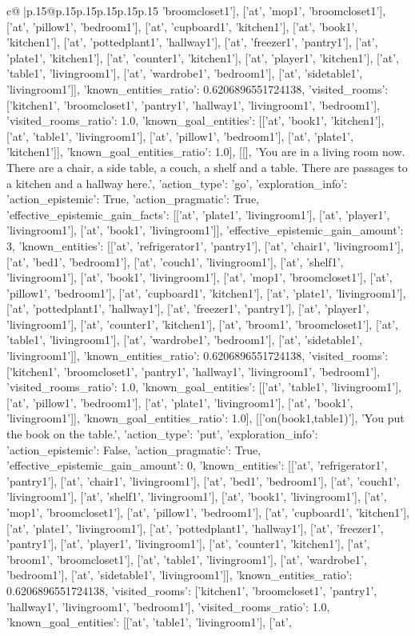 \documentclass{article}
\begin{document}
{\begin{supertabular}{c@{$\;$}|p{.15\linewidth}@{}p{.15\linewidth}p{.15\linewidth}p{.15\linewidth}p{.15\linewidth}p{.15\linewidth}}
{{{'broomcloset1'], ['at', 'mop1', 'broomcloset1'], ['at', 'pillow1', 'bedroom1'], ['at', 'cupboard1', 'kitchen1'], ['at', 'book1', 'kitchen1'], ['at', 'pottedplant1', 'hallway1'], ['at', 'freezer1', 'pantry1'], ['at', 'plate1', 'kitchen1'], ['at', 'counter1', 'kitchen1'], ['at', 'player1', 'kitchen1'], ['at', 'table1', 'livingroom1'], ['at', 'wardrobe1', 'bedroom1'], ['at', 'sidetable1', 'livingroom1']], 'known_entities_ratio': 0.6206896551724138, 'visited_rooms': ['kitchen1', 'broomcloset1', 'pantry1', 'hallway1', 'livingroom1', 'bedroom1'], 'visited_rooms_ratio': 1.0, 'known_goal_entities': [['at', 'book1', 'kitchen1'], ['at', 'table1', 'livingroom1'], ['at', 'pillow1', 'bedroom1'], ['at', 'plate1', 'kitchen1']], 'known_goal_entities_ratio': 1.0}}], [[], 'You are in a living room now. There are a chair, a side table, a couch, a shelf and a table. There are passages to a kitchen and a hallway here.', {'action_type': 'go', 'exploration_info': {'action_epistemic': True, 'action_pragmatic': True, 'effective_epistemic_gain_facts': [['at', 'plate1', 'livingroom1'], ['at', 'player1', 'livingroom1'], ['at', 'book1', 'livingroom1']], 'effective_epistemic_gain_amount': 3, 'known_entities': [['at', 'refrigerator1', 'pantry1'], ['at', 'chair1', 'livingroom1'], ['at', 'bed1', 'bedroom1'], ['at', 'couch1', 'livingroom1'], ['at', 'shelf1', 'livingroom1'], ['at', 'book1', 'livingroom1'], ['at', 'mop1', 'broomcloset1'], ['at', 'pillow1', 'bedroom1'], ['at', 'cupboard1', 'kitchen1'], ['at', 'plate1', 'livingroom1'], ['at', 'pottedplant1', 'hallway1'], ['at', 'freezer1', 'pantry1'], ['at', 'player1', 'livingroom1'], ['at', 'counter1', 'kitchen1'], ['at', 'broom1', 'broomcloset1'], ['at', 'table1', 'livingroom1'], ['at', 'wardrobe1', 'bedroom1'], ['at', 'sidetable1', 'livingroom1']], 'known_entities_ratio': 0.6206896551724138, 'visited_rooms': ['kitchen1', 'broomcloset1', 'pantry1', 'hallway1', 'livingroom1', 'bedroom1'], 'visited_rooms_ratio': 1.0, 'known_goal_entities': [['at', 'table1', 'livingroom1'], ['at', 'pillow1', 'bedroom1'], ['at', 'plate1', 'livingroom1'], ['at', 'book1', 'livingroom1']], 'known_goal_entities_ratio': 1.0}}], [['on(book1,table1)'], 'You put the book on the table.', {'action_type': 'put', 'exploration_info': {'action_epistemic': False, 'action_pragmatic': True, 'effective_epistemic_gain_amount': 0, 'known_entities': [['at', 'refrigerator1', 'pantry1'], ['at', 'chair1', 'livingroom1'], ['at', 'bed1', 'bedroom1'], ['at', 'couch1', 'livingroom1'], ['at', 'shelf1', 'livingroom1'], ['at', 'book1', 'livingroom1'], ['at', 'mop1', 'broomcloset1'], ['at', 'pillow1', 'bedroom1'], ['at', 'cupboard1', 'kitchen1'], ['at', 'plate1', 'livingroom1'], ['at', 'pottedplant1', 'hallway1'], ['at', 'freezer1', 'pantry1'], ['at', 'player1', 'livingroom1'], ['at', 'counter1', 'kitchen1'], ['at', 'broom1', 'broomcloset1'], ['at', 'table1', 'livingroom1'], ['at', 'wardrobe1', 'bedroom1'], ['at', 'sidetable1', 'livingroom1']], 'known_entities_ratio': 0.6206896551724138, 'visited_rooms': ['kitchen1', 'broomcloset1', 'pantry1', 'hallway1', 'livingroom1', 'bedroom1'], 'visited_rooms_ratio': 1.0, 'known_goal_entities': [['at', 'table1', 'livingroom1'], ['at', }}}
\end{supertabular}}
\end{document}

